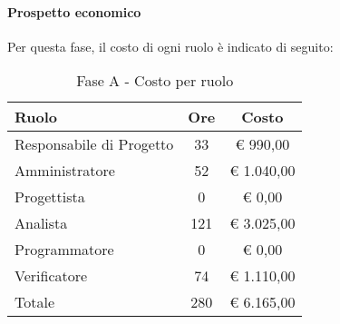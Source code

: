 \documentclass[../PianoProgetto.tex]{subfiles}
\begin{document}
	\paragraph{Prospetto economico}
					Per questa fase, il costo di ogni ruolo è indicato di seguito:
					\begin{table}[h]
		\centering
	
		\begin{tabular}{l * {2}{c}}
			\toprule
			Ruolo & Ore & Costo \\
			\midrule
			Responsabile di Progetto &	33 & \euro{} 990,00 \\
			\midrule
			Amministratore & 52 & \euro{} 1.040,00 \\
			\midrule
			Progettista & 0 & \euro{} 0,00 \\
			\midrule
			Analista & 121 & \euro{} 3.025,00 \\
			\midrule
			Programmatore & 0 & \euro{} 0,00 \\
			\midrule
			Verificatore & 74 & \euro{} 1.110,00 \\
			\midrule		
			Totale & 280 & \euro{} 6.165,00 \\
			\bottomrule
			
		\end{tabular}
		
		\caption{Fase A - Costo per ruolo}
		\label{tab:faseA_costo}
		
	\end{table}
			
\end{document}
